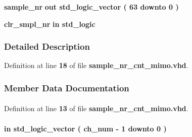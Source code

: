 \begin{DoxyCompactItemize}
{\bf sample\+\_\+nr}  {\bfseries {\bfseries \textcolor{keywordflow}{out}\textcolor{vhdlchar}{ }}} {\bfseries \textcolor{comment}{std\+\_\+logic\+\_\+vector}\textcolor{vhdlchar}{ }\textcolor{vhdlchar}{(}\textcolor{vhdlchar}{ }\textcolor{vhdlchar}{ } \textcolor{vhdldigit}{63} \textcolor{vhdlchar}{ }\textcolor{keywordflow}{downto}\textcolor{vhdlchar}{ }\textcolor{vhdlchar}{ } \textcolor{vhdldigit}{0} \textcolor{vhdlchar}{ }\textcolor{vhdlchar}{)}\textcolor{vhdlchar}{ }} 
\item 
{\bf clr\+\_\+smpl\+\_\+nr}  {\bfseries {\bfseries \textcolor{keywordflow}{in}\textcolor{vhdlchar}{ }}} {\bfseries \textcolor{comment}{std\+\_\+logic}\textcolor{vhdlchar}{ }} 
\end{DoxyCompactItemize}


\subsubsection{Detailed Description}


Definition at line {\bf 18} of file {\bf sample\+\_\+nr\+\_\+cnt\+\_\+mimo.\+vhd}.



\subsubsection{Member Data Documentation}
\paragraph[{ all }]{\hspace{0.3cm}{\ttfamily [Package]}}\label{classsample__nr__cnt__mimo_a470a86ce8776f637b0483eabf2d92ad2}


Definition at line {\bf 13} of file {\bf sample\+\_\+nr\+\_\+cnt\+\_\+mimo.\+vhd}.

\paragraph[{ch\+\_\+en}]{ {\bfseries \textcolor{keywordflow}{in}\textcolor{vhdlchar}{ }} {\bfseries \textcolor{comment}{std\+\_\+logic\+\_\+vector}\textcolor{vhdlchar}{ }\textcolor{vhdlchar}{(}\textcolor{vhdlchar}{ }\textcolor{vhdlchar}{ }\textcolor{vhdlchar}{ }\textcolor{vhdlchar}{ }{\bfseries {\bf ch\+\_\+num}} \textcolor{vhdlchar}{-\/}\textcolor{vhdlchar}{ } \textcolor{vhdldigit}{1} \textcolor{vhdlchar}{ }\textcolor{keywordflow}{downto}\textcolor{vhdlchar}{ }\textcolor{vhdlchar}{ } \textcolor{vhdldigit}{0} \textcolor{vhdlchar}{ }\textcolor{vhdlchar}{)}\textcolor{vhdlchar}{ }} \hspace{0.3cm}{\ttfamily [Port]}}\label{classsample__nr__cnt__mimo_ac6f35edba31976028a83a821781fcf1a}


